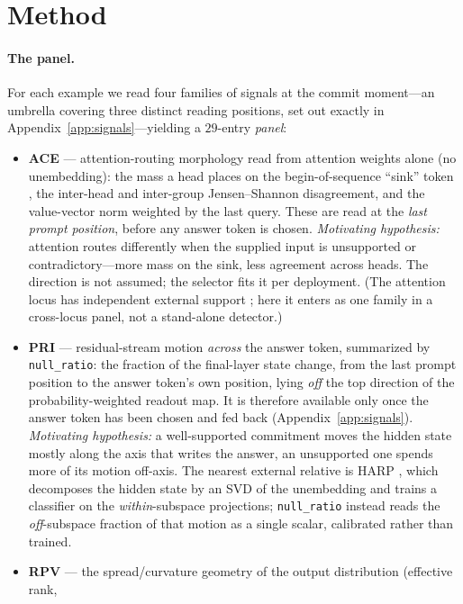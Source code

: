 \documentclass[11pt]{article}
\begin{document}
\section{Method}

\paragraph{The panel.} For each example we read four families of signals at the commit moment---an
umbrella covering three distinct reading positions, set out exactly in
Appendix~\ref{app:signals}---yielding a $29$-entry \emph{panel}:
\begin{itemize}\setlength\itemsep{2pt}
\item \textbf{ACE} --- attention-routing morphology read from attention weights alone (no
unembedding): the mass a head places on the begin-of-sequence ``sink'' token
\cite{xiao2024sinks}, the inter-head and inter-group Jensen--Shannon disagreement, and the
value-vector norm weighted by the last query. These are read at the \emph{last prompt position},
before any answer token is chosen. \emph{Motivating hypothesis:} attention routes differently when
the supplied input is unsupported or contradictory---more mass on the sink, less agreement across
heads. The direction is not assumed; the selector fits it per deployment. (The attention locus has independent external support
\cite{binkowski2026sinks,vazhentsev2025rauq}; here it enters as one family in a cross-locus panel,
not a stand-alone detector.)
\item \textbf{PRI} --- residual-stream motion \emph{across} the answer token, summarized by
\texttt{null\_ratio}: the fraction of the final-layer state change, from the last prompt position to
the answer token's own position, lying \emph{off} the top direction of the probability-weighted
readout map. It is therefore available only once the answer token has been chosen and fed back
(Appendix~\ref{app:signals}). \emph{Motivating hypothesis:} a well-supported commitment moves the
hidden state mostly along the axis that writes the answer, an unsupported one spends more of its
motion off-axis. The nearest
external relative is HARP \cite{hu2025harp}, which decomposes the hidden state by an SVD of the
unembedding and trains a classifier on the \emph{within}-subspace projections;
\texttt{null\_ratio} instead reads the \emph{off}-subspace fraction of that motion as a
single scalar, calibrated rather than trained.
\item \textbf{RPV} --- the spread/curvature geometry of the output distribution (effective rank,

\end{itemize}
\end{document}

